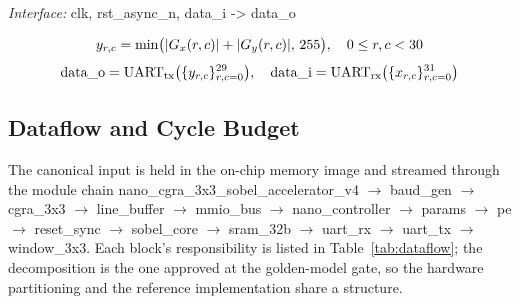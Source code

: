 \documentclass{ieeeaccess}
\begin{document}
\textit{Interface:} clk, rst\_async\_n, data\_i -> data\_o

\begin{equation}
\resizebox{\ifdim\width>\columnwidth\columnwidth\else\width\fi}{!}{$\displaystyle
y_{r,c} = \min\bigl(|G_x(r,c)|+|G_y(r,c)|,\,255\bigr),\quad 0\le r,c < 30
$}
\end{equation}
\begin{equation}
\resizebox{\ifdim\width>\columnwidth\columnwidth\else\width\fi}{!}{$\displaystyle
\text{data\_o} = \text{UART}_{\text{tx}}\bigl(\{y_{r,c}\}_{r,c=0}^{29}\bigr),\quad \text{data\_i} = \text{UART}_{\text{rx}}\bigl(\{x_{r,c}\}_{r,c=0}^{31}\bigr)
$}
\end{equation}
\subsection{Dataflow and Cycle Budget}
The canonical input is held in the on-chip memory image and streamed through the module chain nano\_cgra\_3x3\_sobel\_accelerator\_v4 $\rightarrow$ baud\_gen $\rightarrow$ cgra\_3x3 $\rightarrow$ line\_buffer $\rightarrow$ mmio\_bus $\rightarrow$ nano\_controller $\rightarrow$ params $\rightarrow$ pe $\rightarrow$ reset\_sync $\rightarrow$ sobel\_core $\rightarrow$ sram\_32b $\rightarrow$ uart\_rx $\rightarrow$ uart\_tx $\rightarrow$ window\_3x3. Each block's responsibility is listed in Table~\ref{tab:dataflow}; the decomposition is the one approved at the golden-model gate, so the hardware partitioning and the reference implementation share a structure.
\end{document}
